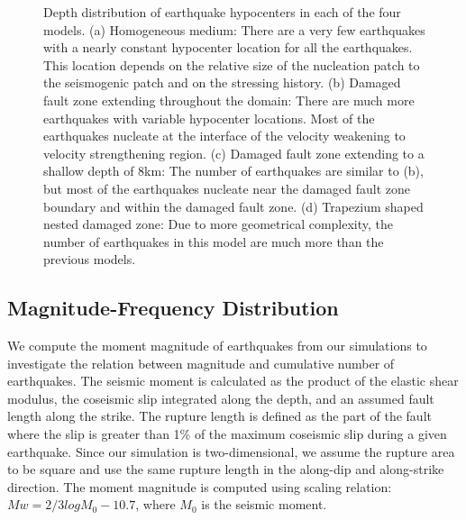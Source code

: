 \documentclass[11pt]{article}
\newcommand{\eric}[1]{{\color{blue}#1}}
\begin{document}
\begin{figure}[!htb]
{    }
    \caption{Depth distribution of earthquake hypocenters in each of the four models. (a) Homogeneous medium: There are a very few earthquakes with a nearly constant hypocenter location for all the earthquakes. This location depends on the relative size of the nucleation patch to the seismogenic patch and on the stressing history. (b) Damaged fault zone extending throughout the domain: There are much more earthquakes with variable hypocenter locations. Most of the earthquakes nucleate at the interface of the velocity weakening to velocity strengthening region. (c) Damaged fault zone extending to a shallow depth of 8km: The number of earthquakes are similar to (b), but most of the earthquakes nucleate near the damaged fault zone boundary and within the damaged fault zone. (d) Trapezium shaped nested damaged zone: Due to more geometrical complexity, the number of earthquakes in this model are much more than the previous models.}
\end{figure}

\subsection{Magnitude-Frequency Distribution}
We compute the moment magnitude of earthquakes from our simulations to investigate the relation between magnitude and cumulative number of earthquakes. \eric{The seismic moment is calculated as the product of the elastic shear modulus, the coseismic slip integrated along the depth, and an assumed fault length along the strike}. The rupture length is defined as the part of the fault where the slip is greater than 1\% of the maximum coseismic slip during a given earthquake. Since our simulation is two-dimensional, we assume the rupture area to be square and use the same rupture length in the along-dip and along-strike direction. The moment magnitude is computed using \citet{kanamori_1975} scaling relation: $Mw=2/3 logM_0-10.7$, where $M_0$ is the seismic moment.
\end{document}
